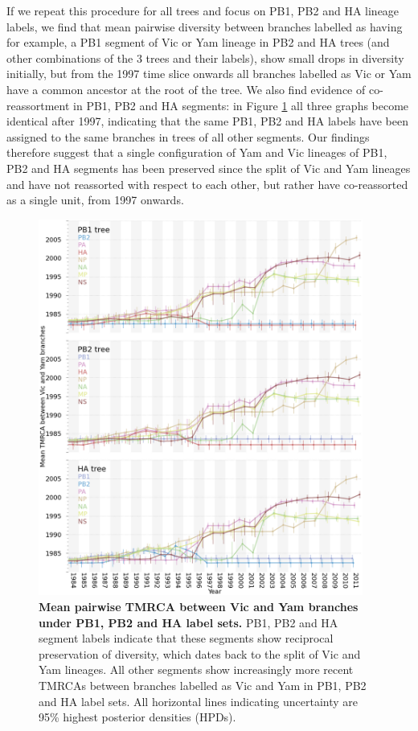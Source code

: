 \documentclass[11pt,oneside,letterpaper]{article}
\begin{document}
If we repeat this procedure for all trees and focus on PB1, PB2 and HA lineage labels, we find that mean pairwise diversity between branches labelled as having for example, a PB1 segment of Vic or Yam lineage in PB2 and HA trees (and other combinations of the 3 trees and their labels), show small drops in diversity initially, but from the 1997 time slice onwards all branches labelled as Vic or Yam have a common ancestor at the root of the tree.
We also find evidence of co-reassortment in PB1, PB2 and HA segments: in Figure \ref{betweenDiversity} all three graphs become identical after 1997, indicating that the same PB1, PB2 and HA labels have been assigned to the same branches in trees of all other segments.
Our findings therefore suggest that a single configuration of Yam and Vic lineages of PB1, PB2 and HA segments has been preserved since the split of Vic and Yam lineages and have not reassorted with respect to each other, but rather have co-reassorted as a single unit, from 1997 onwards.

\begin{figure}
	\centering		
	\includegraphics[width=0.95\textwidth]{figures/InfB_betweenDiversity.png}
	\caption{\textbf{Mean pairwise TMRCA between Vic and Yam branches under PB1, PB2 and HA label sets.}
PB1, PB2 and HA segment labels indicate that these segments show reciprocal preservation of diversity, which dates back to the split of Vic and Yam lineages.
All other segments show increasingly more recent TMRCAs between branches labelled as Vic and Yam in PB1, PB2 and HA label sets.
All horizontal lines indicating uncertainty are 95\% highest posterior densities (HPDs).}
	\label{betweenDiversity}
\end{figure}
\end{document}
